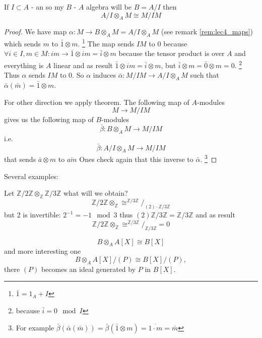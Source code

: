 \begin{proposition}
  If $I \subset A$ - an  so my $B$ - $A$ algebra
  will be $B = A/I$ then
  \[
  A/I \otimes_A M \cong M/IM
  \]
  \begin{proof}
    We have map $\alpha: M \to B \otimes_A M = A/I \otimes_A M$
    (see remark \ref{rem:lec4_maps}) 
    which sends $m$ to $\bar{1} \otimes m$.
    \footnote{
      $\bar{1} = 1_A + I$
    }
    The map sends $IM$ to $0$
    because
    $\forall i \in I, m \in M : im \to \bar{1} \otimes im = \bar{i} \otimes m$
    because the tensor product is over $A$ and everything is $A$
    linear and as result $\bar{1} \otimes im = \bar{i} \otimes m$,
    but $\bar{i} \otimes m = \bar{0} \otimes m = 0$.
    \footnote{
      because
      $\bar{i} = 0 \mod I$
    }
    Thus $\alpha$ sends $IM$ to 0. So $\alpha$ induces
    $\bar{\alpha}: M/IM \to A/I \otimes_A M$ such that
    $\bar{\alpha}\left(\bar{m}\right) = \bar{1} \otimes m$.

    For other direction we apply  theorem. The
    following map of $A$-modules
    \[
    M \to M/IM
    \]
    gives us the following map of $B$-modules
    \[
    \bar{\beta}: B \otimes_A M \to M/IM
    \]
    i.e.
    \[
    \bar{\beta}: A/I \otimes_A M \to M/IM
    \]
    that sends $\bar{a} \otimes m$ to $\bar{am}$
    Ones check again that this inverse to $\bar{\alpha}$.
    \footnote{
      For example
      \(
      \bar{\beta}\left(\bar{\alpha}\left(\bar{m}\right)\right) =
      \bar{\beta}\left(\bar{1} \otimes m\right) = \overline{1 \cdot m} = \bar{m}
      \)
    }
  \end{proof}
  \label{prop:lec4_prop2}
\end{proposition}

Several examples:
\begin{example}
  Let $\mathbb{Z}/2\mathbb{Z} \otimes_\mathbb{Z}
  \mathbb{Z}/3\mathbb{Z}$ what will we obtain?
  \[
  \mathbb{Z}/2\mathbb{Z} \otimes_\mathbb{Z} \cong
  ^{\mathbb{Z}/3\mathbb{Z}}/_{(2) \cdot \mathbb{Z}/3\mathbb{Z}}
  \]
  but 2 is invertible: $2^{-1} = -1 \mod 3$ thus
  $(2)\mathbb{Z}/3\mathbb{Z} =\mathbb{Z}/3\mathbb{Z}$ and as result
   \[
  \mathbb{Z}/2\mathbb{Z} \otimes_\mathbb{Z} \cong
  ^{\mathbb{Z}/3\mathbb{Z}}/_{ \mathbb{Z}/3\mathbb{Z}} = 0
  \]
\end{example}

\begin{example}
  \[
  B \otimes_A A\left[X\right] \cong B\left[X\right]
  \]
  and more interesting one
  \[
  B \otimes_A A\left[X\right]/(P) \cong B\left[X\right]/(P),
  \]
  there $(P)$ becomes an ideal generated by $P$ in
  $B\left[X\right]$.
\end{example}


